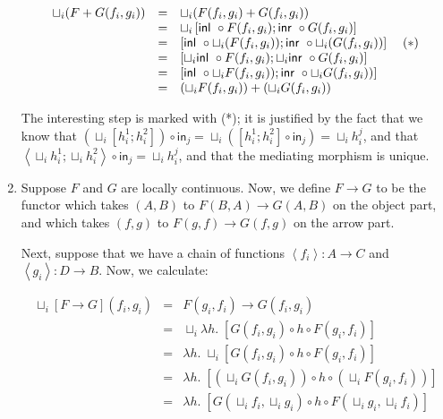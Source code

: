 \documentclass[12pt]{article}
\begin{document}
\begin{enumerate}
\begin{displaymath}
\begin{array}{lcl}
  \sqcup_i (F + G (f_i,g_i)) 
   & = & \sqcup_i (F(f_i,g_i) + G(f_i,g_i)) \\
   & = & \sqcup_i \left[\mbox{\textsf{{inl }}}\circ F(f_i,g_i); 
                        \mbox{\textsf{{inr }}}\circ G(f_i,g_i)\right]\\
   & = & \left[\mbox{\textsf{{inl }}}\circ \sqcup_i (F(f_i,g_i));
               \mbox{\textsf{{inr }}}\circ \sqcup_i (G(f_i,g_i))\right] \;\;\;\;(*)\\
   & = & \left[\sqcup_i \mbox{\textsf{{inl }}}\circ F(f_i,g_i);
               \sqcup_i \mbox{\textsf{{inr }}}\circ G(f_i,g_i) \right]\\
   & = & \left[\mbox{\textsf{{inl }}}\circ \sqcup_i F(f_i,g_i));
               \mbox{\textsf{{inr }}}\circ \sqcup_i G(f_i,g_i))\right]\\
   & = & (\sqcup_i F(f_i,g_i)) + (\sqcup_i G(f_i,g_i))\\
\end{array}
\end{displaymath}

The interesting step is marked with (*); it is justified by the fact
that we know that $(\sqcup_i \left[h^1_i;h^2_i\right]) \circ
\mathsf{in}_j = 
\sqcup_i (\left[h^1_i;h^2_i\right] \circ \mathsf{in}_j) = 
\sqcup_i h^j_i$, and that $\left<\sqcup_i h^1_i; \sqcup_i
h^2_i\right> \circ \mathsf{in}_j = \sqcup_i h^j_i$, and that the mediating
morphism is unique.

\item Suppose $F$ and $G$ are locally continuous. Now, we define 
$F \to G$ to be the functor which takes $(A,B)$ to $F(B,A) \to G(A,B)$
on the object part, and which takes $(f,g)$ to $F(g,f) \to G(f,g)$ on
the arrow part.
 
Next, suppose that we have a chain of functions $\left<f_i\right> : A \to C$ 
and $\left<g_i\right> : D \to B$. Now, we calculate:
 
\begin{displaymath}
\begin{array}{lcl}
\sqcup_i [F \to G](f_i,g_i) & = & F(g_i,f_i) \to G(f_i,g_i) \\
& = & 
  \sqcup_i \lambda h.\; [G(f_i,g_i) \circ h \circ F(g_i, f_i)] \\
& = & 
  \lambda h.\; \sqcup_i [G(f_i,g_i) \circ h \circ F(g_i, f_i)]  \\
& = & 
  \lambda h.\; [(\sqcup_i G(f_i,g_i)) \circ h \circ (\sqcup_i F(g_i, f_i))] \\
& = & 
  \lambda h.\; [G(\sqcup_i f_i, \sqcup_ig_i) \circ h \circ 
                F(\sqcup_i g_i, \sqcup_i f_i)] \\
\end{array}
\end{displaymath}


\end{enumerate}
\end{document}
